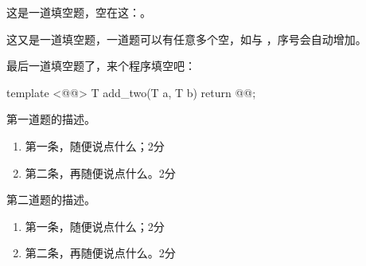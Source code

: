 \documentclass[answer,sheet]{cuzexam} %
\begin{document}
\begin{problem}
    这是一道填空题，空在这：。
\end{problem}

\begin{problem}
    这又是一道填空题，一道题可以有任意多个空，如与
    ，序号会自动增加。
\end{problem}

\begin{problem}
    最后一道填空题了，来个程序填空吧：
    \begin{cppcode}
        template <@@>
        T add_two(T a, T b) {
            return @@;
        }
    \end{cppcode}
\end{problem}

\begin{sheetcontents}
\end{sheetcontents}


\begin{problem}
    第一道题的描述。
\end{problem}

\begin{solution}
    \begin{enumerate}[label=(\arabic*)]
        \item 第一条，随便说点什么；\dotfill 2分
        \item 第二条，再随便说点什么。\dotfill 2分
    \end{enumerate}
\end{solution}

\begin{studentanswer}
    \vspace{28ex}
\end{studentanswer}

\begin{problem}
    第二道题的描述。
\end{problem}

\begin{solution}
    \begin{enumerate}[label=(\arabic*)]
        \item 第一条，随便说点什么；\dotfill 2分
        \item 第二条，再随便说点什么。\dotfill 2分
    \end{enumerate}
\end{solution}
\end{document}
